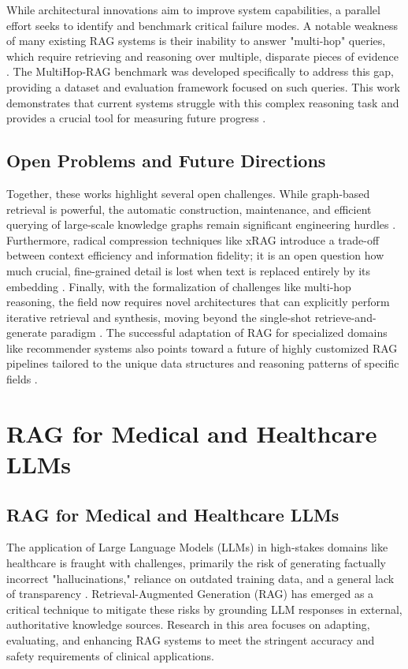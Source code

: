 \documentclass[11pt]{article}
\begin{document}
While architectural innovations aim to improve system capabilities, a parallel effort seeks to identify and benchmark critical failure modes. A notable weakness of many existing RAG systems is their inability to answer "multi-hop" queries, which require retrieving and reasoning over multiple, disparate pieces of evidence \cite{ref6}. The MultiHop-RAG benchmark was developed specifically to address this gap, providing a dataset and evaluation framework focused on such queries. This work demonstrates that current systems struggle with this complex reasoning task and provides a crucial tool for measuring future progress \cite{ref6}.

\subsection*{Open Problems and Future Directions}

Together, these works highlight several open challenges. While graph-based retrieval is powerful, the automatic construction, maintenance, and efficient querying of large-scale knowledge graphs remain significant engineering hurdles . Furthermore, radical compression techniques like xRAG introduce a trade-off between context efficiency and information fidelity; it is an open question how much crucial, fine-grained detail is lost when text is replaced entirely by its embedding \cite{ref4}. Finally, with the formalization of challenges like multi-hop reasoning, the field now requires novel architectures that can explicitly perform iterative retrieval and synthesis, moving beyond the single-shot retrieve-and-generate paradigm \cite{ref6}. The successful adaptation of RAG for specialized domains like recommender systems also points toward a future of highly customized RAG pipelines tailored to the unique data structures and reasoning patterns of specific fields \cite{ref9}.

\section{RAG for Medical and Healthcare LLMs}
\subsection*{RAG for Medical and Healthcare LLMs}

The application of Large Language Models (LLMs) in high-stakes domains like healthcare is fraught with challenges, primarily the risk of generating factually incorrect "hallucinations," reliance on outdated training data, and a general lack of transparency . Retrieval-Augmented Generation (RAG) has emerged as a critical technique to mitigate these risks by grounding LLM responses in external, authoritative knowledge sources. Research in this area focuses on adapting, evaluating, and enhancing RAG systems to meet the stringent accuracy and safety requirements of clinical applications.
\end{document}
